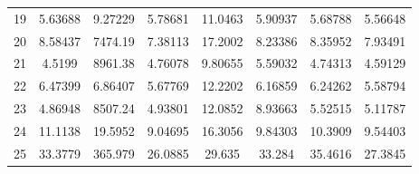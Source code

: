 \begin{center}
\begin{longtable}{cccccccc}
19 & 5.63688 & 9.27229 & 5.78681 & 11.0463 & 5.90937 & 5.68788 & 5.56648\\
20 & 8.58437 & 7474.19 & 7.38113 & 17.2002 & 8.23386 & 8.35952 & 7.93491\\
21 & 4.5199 & 8961.38 & 4.76078 & 9.80655 & 5.59032 & 4.74313 & 4.59129\\
22 & 6.47399 & 6.86407 & 5.67769 & 12.2202 & 6.16859 & 6.24262 & 5.58794\\
23 & 4.86948 & 8507.24 & 4.93801 & 12.0852 & 8.93663 & 5.52515 & 5.11787\\
24 & 11.1138 & 19.5952 & 9.04695 & 16.3056 & 9.84303 & 10.3909 & 9.54403\\
25 & 33.3779 & 365.979 & 26.0885 & 29.635 & 33.284 & 35.4616 & 27.3845\\
\end{longtable}
\end{center}



